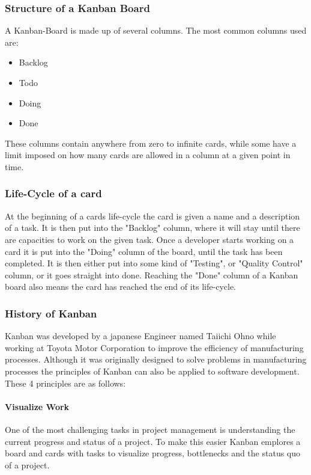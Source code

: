 \subsubsection{Structure of a Kanban Board}
A Kanban-Board is made up of several columns. The most common columns used are:
\begin{itemize}
\item Backlog
\item Todo
\item Doing
\item Done
\end{itemize}
These columns contain anywhere from zero to infinite cards, while some have a limit imposed on how many cards are allowed in a column at a given point in time.

\subsubsection{Life-Cycle of a card}
At the beginning of a cards life-cycle the card is given a name and a description of a task. It is then put into the "Backlog" column, where it will stay until there are capacities
to work on the given task. Once a developer starts working on a card it is put into the "Doing" column of the board, until the task has been completed. It is then either put into
some kind of "Testing", or "Quality Control" column, or it goes straight into done. Reaching the "Done" column of a Kanban board also means the card has reached the end of its
life-cycle.

\subsubsection{History of Kanban}
Kanban was developed by a japanese Engineer named Taiichi Ohno while working at Toyota Motor Corporation to improve the efficiency of manufacturing processes. Although it was originally
designed to solve problems in manufacturing processes the principles of Kanban can also be applied to software development. These 4 principles are as follows:

\paragraph{Visualize Work}
One of the most challenging tasks in project management is understanding the current progress and status of a project. To make this easier Kanban emplores a board and cards with tasks to
visualize progress, bottlenecks and the status quo of a project.


